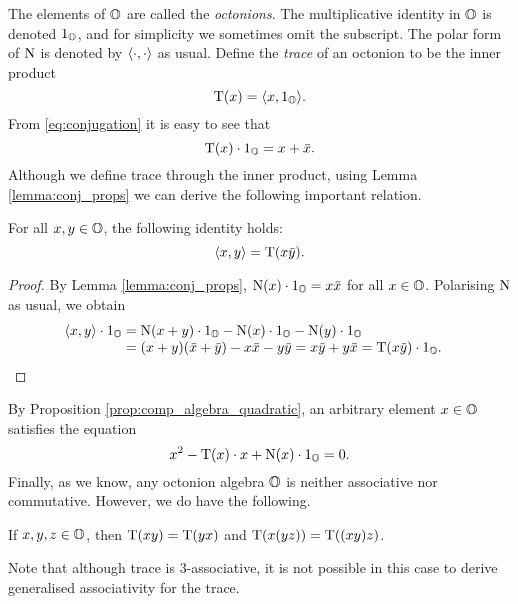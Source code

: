 The elements of $\mathbb{O}$ are called the \textit{octonions}. 
The multiplicative identity in $\mathbb{O}$ is denoted $1_{\mathbb{O}}$, and for simplicity we sometimes omit the subscript. The polar form of $\mathord{\mathrm{N}}$ is denoted by $\langle \cdot, \cdot \rangle$ as usual. Define the 
\textit{trace} of an octonion to be the inner product
\begin{equation}
	\operatorname{T}(x) = \langle x, 1_{\mathbb{O}} \rangle.
\end{equation}
From \ref{eq:conjugation} it is easy to see that
\begin{equation}
	\operatorname{T}(x)\cdot 1_{\mathbb{O}} = x + \mathord{\mbox{\hspace*{0pt}}\,\overline{\!x\!\!\;}\!\:}\mbox{\hspace*{0pt}}. 
\end{equation}
Although we define trace through the inner product, using Lemma \ref{lemma:conj_props} we can
derive the following important relation.
\begin{lemma}
	For all $x,y \in \mathbb{O}$, the following identity holds:
	\begin{equation}
		\langle x, y \rangle = \operatorname{T}(x\mathord{\mbox{\hspace*{0pt}}\,\overline{\!y\!\!\;}\!\:}\mbox{\hspace*{0pt}}).
	\end{equation}
\end{lemma}
\begin{proof}
	By Lemma \ref{lemma:conj_props}, $\mathord{\mathrm{N}}(x)\cdot 1_{\mathbb{O}} = x \mathord{\mbox{\hspace*{0pt}}\,\overline{\!x\!\!\;}\!\:}\mbox{\hspace*{0pt}}$ for all $x \in \mathbb{O}$.
	Polarising $\mathord{\mathrm{N}}$ as usual, we obtain
	\begin{equation*}
		\begin{array}{r@{\;}c@{\;}l}
			\inner{x}{y}\cdot 1_{\O} & = &  \NN(x+y)\cdot 1_{\O} - \NN(x)\cdot 1_{\O} - 
												\NN(y)\cdot 1_{\O} \\							
			& = &  (x + y)(\ovx + \ovy) - x\ovx - y\ovy = x\ovy + y\ovx = \Tr(x\ovy) \cdot 1_{\O} .\ \ \  
		\end{array}
	\end{equation*}
	\par \vspace{-1.7\baselineskip} \qedhere
\end{proof}
By Proposition \ref{prop:comp_algebra_quadratic}, an arbitrary element $x \in \mathbb{O}$
satisfies the equation
\begin{equation}
	x^2 - \operatorname{T}(x)\cdot x + \mathord{\mathrm{N}}(x)\cdot 1_{\mathbb{O}} = 0.
\end{equation}
Finally, as we know, any octonion algebra $\mathbb{O}$ is neither associative nor commutative. However,
we do have the following.
\begin{lemma}
	\label{lemma:trace_3assoc}
	If $x,y,z \in \mathbb{O}$, then $\operatorname{T}(xy) = \operatorname{T}(yx)$ and $\operatorname{T}(x(yz)) = \operatorname{T}((xy) z)$. 
\end{lemma}
Note that although trace is $3$-associative, it is not possible in this case to derive
generalised associativity for the trace. 

